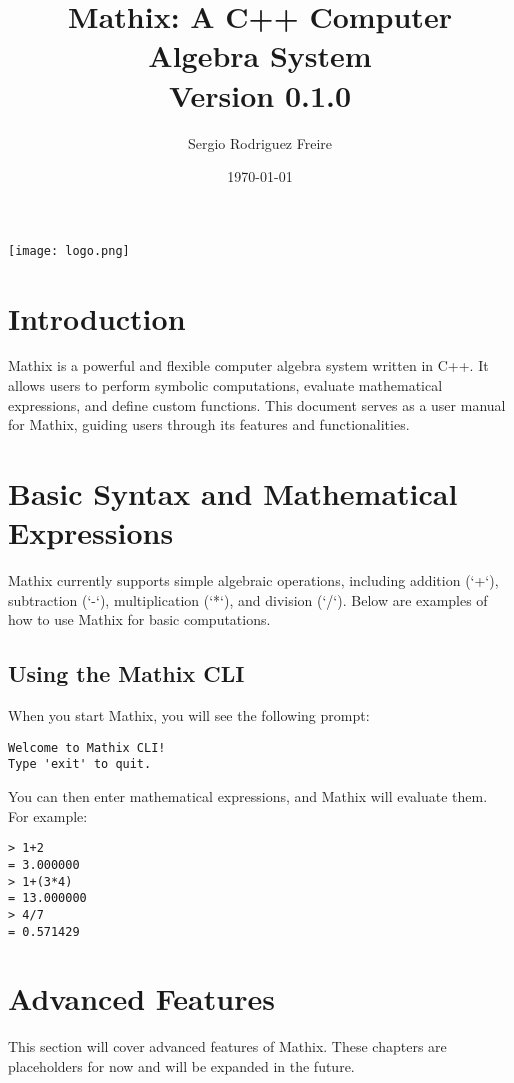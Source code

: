 \documentclass[a4paper,12pt]{article}
\title{Mathix: A C++ Computer Algebra System \\ \large Version 0.1.0}
\author{Sergio Rodriguez Freire}
\date{\today}
\begin{document}
\maketitle
\begin{center}
    \texttt{[image: logo.png]} %
\end{center}

\tableofcontents
\newpage

\section{Introduction}
Mathix is a powerful and flexible computer algebra system written in C++. It allows users to perform symbolic computations, evaluate mathematical expressions, and define custom functions. This document serves as a user manual for Mathix, guiding users through its features and functionalities.

\section{Basic Syntax and Mathematical Expressions}
Mathix currently supports simple algebraic operations, including addition (`+`), subtraction (`-`), multiplication (`*`), and division (`/`). Below are examples of how to use Mathix for basic computations.

\subsection{Using the Mathix CLI}
When you start Mathix, you will see the following prompt:
\begin{lstlisting}
Welcome to Mathix CLI!
Type 'exit' to quit.
\end{lstlisting}

You can then enter mathematical expressions, and Mathix will evaluate them. For example:

\begin{lstlisting}
> 1+2
= 3.000000
> 1+(3*4)
= 13.000000
> 4/7
= 0.571429
\end{lstlisting}

\section{Advanced Features}
This section will cover advanced features of Mathix. These chapters are placeholders for now and will be expanded in the future.
\end{document}
